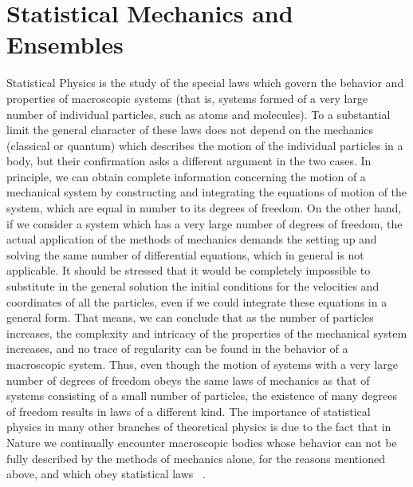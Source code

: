 \section{Statistical Mechanics and  Ensembles}
Statistical Physics is the study of the special laws which govern the behavior and properties of macroscopic systems (that is, systems formed of a very large number of individual particles, such as atoms and molecules). To a substantial limit the general character of these laws does not depend on the mechanics (classical or quantum) which describes the motion of the individual particles in a body, but their confirmation asks a different argument in the two cases. In principle, we can obtain complete information concerning the motion of a mechanical system by constructing and integrating the equations of motion of the system, which are equal in number to its degrees of freedom. On the other hand,  if we consider a system which has a very large number of degrees of freedom, the actual application of the methods of mechanics demands the setting up and solving the same number of differential equations, which in general is not applicable. It should be stressed that it would be completely impossible to substitute in the general solution the initial conditions for the velocities and coordinates of all the particles, even if we could integrate these equations in a general form. That means, we can conclude that as the number of particles increases, the complexity and intricacy of the properties of the mechanical system increases, and  no trace of regularity can be found in the behavior of a macroscopic system. Thus, even though the motion of systems with a very large number of degrees of freedom obeys the same laws of mechanics as that of systems consisting of a small number of particles, the existence of many degrees of freedom results in laws of a different kind. The importance of statistical physics in many other branches of theoretical  physics is due to the fact that in Nature we continually encounter macroscopic bodies whose behavior can not be fully described by the methods of mechanics alone, for the reasons mentioned above, and which obey statistical laws ~\citep{Landau1980}.

